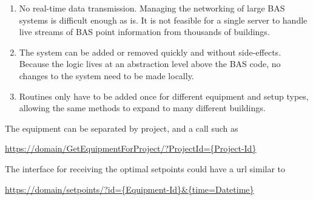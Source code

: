 \begin{enumerate}
    \item No real-time data transmission. Managing the networking of large BAS systems is difficult enough as is. It is not feasible for a single server to handle live streams of BAS point information from thousands of buildings. 

    \item The system can be added or removed quickly and without side-effects. Because the logic lives at an abstraction level above the BAS code, no changes to the system need to be made locally. 

    \item Routines only have to be added once for different equipment and setup types, allowing the same methods to expand to many different buildings. 


\end{enumerate}

The equipment can be separated by project, and a call such as

\url{https://domain/GetEquipmentForProject/?ProjectId={Project-Id}}

The interface for receiving the optimal setpoints could have a url similar to 

\url{https://domain/setpoints/?id={Equipment-Id}\&{time=Datetime}}


